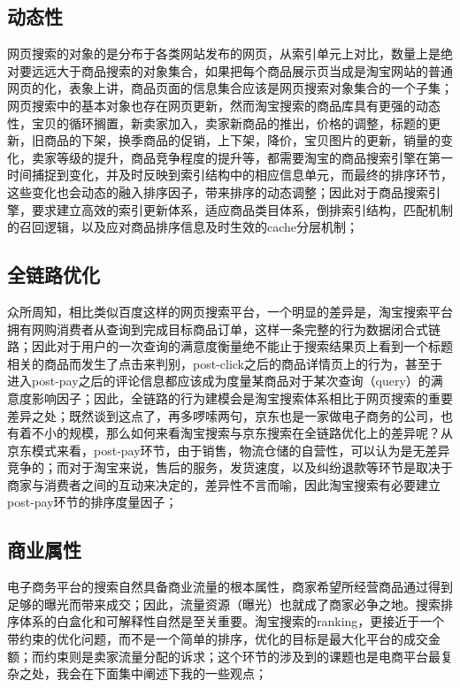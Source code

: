 \subsection{动态性}

网页搜索的对象的是分布于各类网站发布的网页，从索引单元上对比，数量上是绝对要远远大于商品搜索的对象集合，如果把每个商品展示页当成是淘宝网站的普通网页的化，表象上讲，商品页面的信息集合应该是网页搜索对象集合的一个子集；网页搜索中的基本对象也存在网页更新，然而淘宝搜索的商品库具有更强的动态性，宝贝的循环搁置，新卖家加入，卖家新商品的推出，价格的调整，标题的更新，旧商品的下架，换季商品的促销，上下架，降价，宝贝图片的更新，销量的变化，卖家等级的提升，商品竞争程度的提升等，都需要淘宝的商品搜索引擎在第一时间捕捉到变化，并及时反映到索引结构中的相应信息单元，而最终的排序环节，这些变化也会动态的融入排序因子，带来排序的动态调整；因此对于商品搜索引擎，要求建立高效的索引更新体系，适应商品类目体系，倒排索引结构，匹配机制的召回逻辑，以及应对商品排序信息及时生效的cache分层机制；

\subsection{全链路优化}

众所周知，相比类似百度这样的网页搜索平台，一个明显的差异是，淘宝搜索平台拥有网购消费者从查询到完成目标商品订单，这样一条完整的行为数据闭合式链路；因此对于用户的一次查询的满意度衡量绝不能止于搜索结果页上看到一个标题相关的商品而发生了点击来判别，post-click之后的商品详情页上的行为，甚至于进入post-pay之后的评论信息都应该成为度量某商品对于某次查询（query）的满意度影响因子；因此，全链路的行为建模会是淘宝搜索体系相比于网页搜索的重要差异之处；既然谈到这点了，再多啰嗦两句，京东也是一家做电子商务的公司，也有着不小的规模，那么如何来看淘宝搜索与京东搜索在全链路优化上的差异呢？从京东模式来看，post-pay环节，由于销售，物流仓储的自营性，可以认为是无差异竞争的；而对于淘宝来说，售后的服务，发货速度，以及纠纷退款等环节是取决于商家与消费者之间的互动来决定的，差异性不言而喻，因此淘宝搜索有必要建立post-pay环节的排序度量因子；

\subsection{商业属性}

电子商务平台的搜索自然具备商业流量的根本属性，商家希望所经营商品通过得到足够的曝光而带来成交；因此，流量资源（曝光）也就成了商家必争之地。搜索排序体系的白盒化和可解释性自然是至关重要。淘宝搜索的ranking，更接近于一个带约束的优化问题，而不是一个简单的排序，优化的目标是最大化平台的成交金额；而约束则是卖家流量分配的诉求；这个环节的涉及到的课题也是电商平台最复杂之处，我会在下面集中阐述下我的一些观点；

